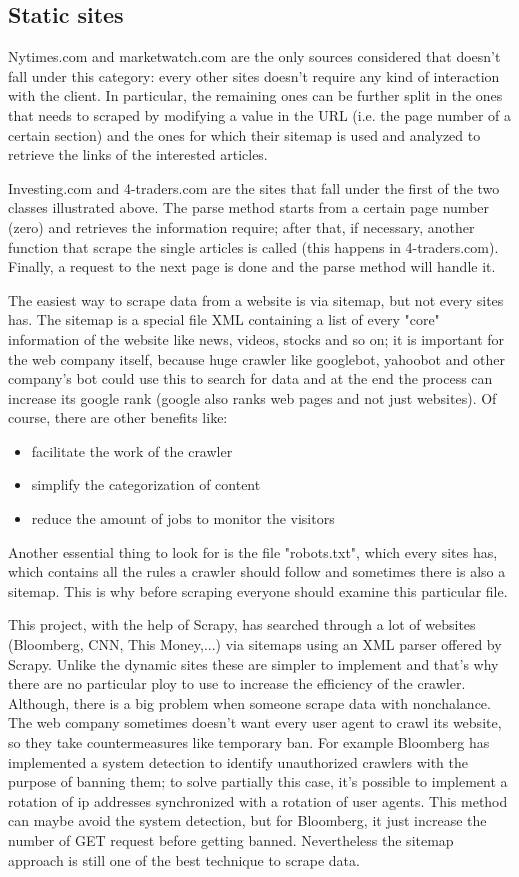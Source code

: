 \subsection{Static sites}
Nytimes.com and marketwatch.com are the only sources considered that doesn't fall under this category: every other sites doesn't require any kind of interaction with the client. In particular, the remaining ones can be further split in the ones that needs to scraped by modifying a value in the URL (i.e. the page number of a certain section) and the ones for which their sitemap is used and analyzed to retrieve the links of the interested articles. 
\par
Investing.com and 4-traders.com are the sites that fall under the first of the two classes illustrated above. The parse method starts from a certain page number (zero) and retrieves the information require; after that, if necessary, another function that scrape the single articles is called (this happens in 4-traders.com). Finally, a request to the next page is done and the parse method will handle it.
\par 
The easiest way to scrape data from a website is via sitemap, but not every sites has. 
The sitemap is a special file XML containing a list of every "core" information of the website like news, videos, stocks and so on; it is important for the web company itself, because huge crawler like googlebot, yahoobot and other company's bot could use this to search for data and at the end the process can increase its google rank (google also ranks web pages and not just websites). 
Of course, there are other benefits like:
\begin{itemize}
	\item facilitate the work of the crawler
	\item simplify the categorization of content
	\item reduce the amount of jobs to monitor the visitors
\end{itemize}
Another essential thing to look for is the file "robots.txt", which every sites has, which contains all the rules a crawler should follow and sometimes there is also a sitemap. 
This is why before scraping everyone should examine this particular file. 
\par 
This project, with the help of Scrapy, has searched through a lot of websites (Bloomberg, CNN, This Money,...) via sitemaps using an XML parser offered by Scrapy. 
Unlike the dynamic sites these are simpler to implement and that's why there are no particular ploy to use to increase the efficiency of the crawler. 
Although, there is a big problem when someone scrape data with nonchalance. 
The web company sometimes doesn't want every user agent to crawl its website, so they take countermeasures like temporary ban. 
For example Bloomberg has implemented a system detection to identify unauthorized crawlers with the purpose of banning them; to solve partially this case, it's possible to implement a rotation of ip addresses synchronized with a rotation of user agents. 
This method can maybe avoid the system detection, but for Bloomberg, it just increase the number of GET request before getting banned. 
Nevertheless the sitemap approach is still one of the best technique to scrape data.